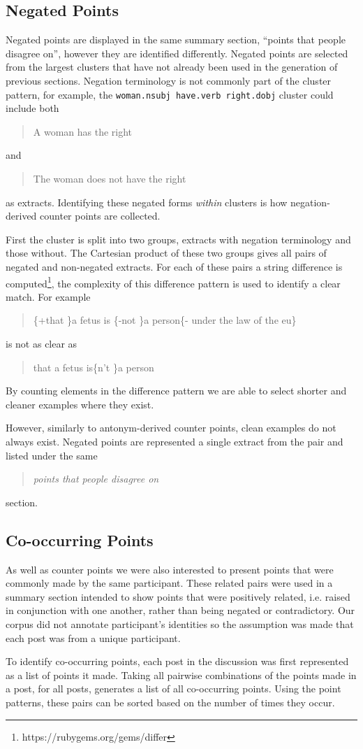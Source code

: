     \subsection{Negated Points \label{neg-points}}
      Negated points are displayed in the same summary section, ``points that people disagree on'', however they are identified differently. Negated points are selected from the largest clusters that have not already been used in the generation of previous sections. Negation terminology is not commonly part of the cluster pattern, for example, the \texttt{woman.nsubj have.verb right.dobj} cluster could include both \blockquote{A woman has the right} and \blockquote{The woman does not have the right} as extracts. Identifying these negated forms \textit{within} clusters is how negation-derived counter points are collected.

      First the cluster is split into two groups, extracts with negation terminology and those without. The Cartesian product of these two groups gives all pairs of negated and non-negated extracts. For each of these pairs a string difference is computed\footnote{https://rubygems.org/gems/differ}, the complexity of this difference pattern is used to identify a clear match. For example \blockquote{\{+that \}a fetus is \{-not \}a person\{- under the law of the eu\}} is not as clear as \blockquote{that a fetus is\{n't \}a person}. By counting elements in the difference pattern we are able to select shorter and cleaner examples where they exist.

      However, similarly to antonym-derived counter points, clean examples do not always exist. Negated points are represented a single extract from the pair and listed under the same \blockquote{\textit{points that people disagree on}} section.

    \subsection{Co-occurring Points}
      As well as counter points we were also interested to present points that were commonly made by the same participant. These related pairs were used in a summary section intended to show points that were positively related, i.e. raised in conjunction with one another, rather than being negated or contradictory. Our corpus did not annotate participant's identities so the assumption was made that each post was from a unique participant.

      To identify co-occurring points, each post in the discussion was first represented as a list of points it made. Taking all pairwise combinations of the points made in a post, for all posts, generates a list of all co-occurring points. Using the point patterns, these pairs can be sorted based on the number of times they occur.

